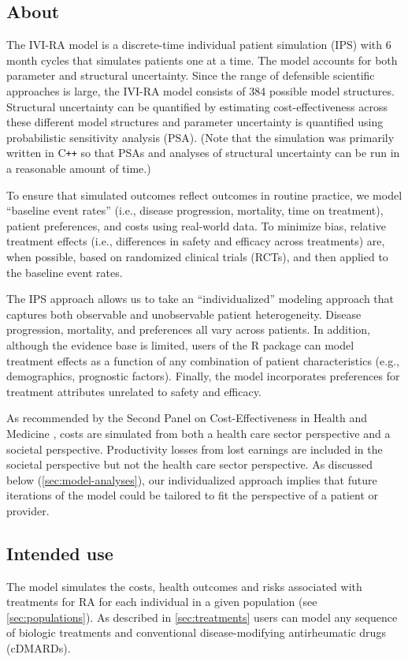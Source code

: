 \documentclass[11pt,final,fleqn]{article}
\theoremstyle{plain}
\newcommand\CPP{{C\texttt{++}}}
\newcommand\R{{\textsf{R}}}
\begin{document}
\subsection{About}
The IVI-RA model is a discrete-time individual patient simulation (IPS) with 6 month cycles that simulates patients one at a time. The model accounts for both parameter and structural uncertainty. Since the range of defensible scientific approaches is large, the IVI-RA model consists of 384 possible model structures. Structural uncertainty can be quantified by estimating cost-effectiveness across these different model structures and parameter uncertainty is quantified using probabilistic sensitivity analysis (PSA). (Note that the simulation was primarily written in \CPP{} so that PSAs and analyses of structural uncertainty can be run in a reasonable amount of time.)

To ensure that simulated outcomes reflect outcomes in routine practice, we model ``baseline event rates'' (i.e., disease progression, mortality, time on treatment), patient preferences, and costs using real-world data. To minimize bias, relative treatment effects (i.e., differences in safety and efficacy across treatments) are, when possible, based on randomized clinical trials (RCTs), and then applied to the baseline event rates.

The IPS approach allows us to take an ``individualized'' modeling approach that captures both observable and unobservable patient heterogeneity. Disease progression, mortality, and preferences all vary across patients. In addition, although the evidence base is limited, users of the \R{} package can model treatment effects as a function of any combination of patient characteristics (e.g., demographics, prognostic factors). Finally, the model incorporates preferences for treatment attributes unrelated to safety and efficacy. 

As recommended by the Second Panel on Cost-Effectiveness in Health and Medicine \citep{sanders2016recommendations}, costs are simulated from both a health care sector perspective and a societal perspective. Productivity losses from lost earnings are included in the societal perspective but not the health care sector perspective. As discussed below (\autoref{sec:model-analyses}), our individualized approach implies that future iterations of the model could be tailored to fit the perspective of a patient or provider.     

\subsection{Intended use}\label{sec:model-analyses}
The model simulates the costs, health outcomes and risks associated with treatments for RA for each individual in a given population (see \autoref{sec:populations}). As described in \autoref{sec:treatments} users can model any sequence of biologic treatments and conventional disease-modifying antirheumatic drugs (cDMARDs). 
\end{document}
